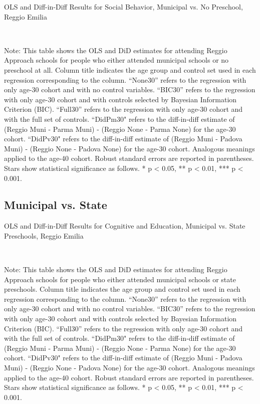 \begin{landscape}
\begin{table}[H] \caption{OLS and Diff-in-Diff Results for Social Behavior, Municipal vs. No Preschool, Reggio Emilia} \label{ols-S-reg}
\scalebox{0.85}{
}
\vspace{1ex} \\
\footnotesize\raggedright{Note: This table shows the OLS and DiD estimates for attending Reggio Approach schools for people who either attended municipal schools or no preschool at all. Column title indicates the age group and control set used in each regression corresponding to the column. ``None30'' refers to the regression with only age-30 cohort and with no control variables. ``BIC30'' refers to the regression with only age-30 cohort and with controls selected by Bayesian Information Criterion (BIC). ``Full30'' refers to the regression with only age-30 cohort and with the full set of controls. ``DidPm30" refers to the diff-in-diff estimate of (Reggio Muni - Parma Muni) - (Reggio None - Parma None) for the age-30 cohort. ``DidPv30" refers to the diff-in-diff estimate of (Reggio Muni - Padova Muni) - (Reggio None - Padova None) for the age-30 cohort. Analogous meanings applied to the age-40 cohort. Robust standard errors are reported in parentheses. Stars show statistical significance as follows. * p < 0.05, ** p < 0.01, *** p < 0.001.}
\end{table}



\subsection{Municipal vs. State}
\begin{table}[H] \caption{OLS and Diff-in-Diff Results for Cognitive and Education, Municipal vs. State Preschools, Reggio Emilia} \label{ols-E-reg}
\scalebox{0.85}{}
\vspace{1ex} \\
\footnotesize\raggedright{Note: This table shows the OLS and DiD estimates for attending Reggio Approach schools for people who either attended municipal schools or state preschools. Column title indicates the age group and control set used in each regression corresponding to the column. ``None30'' refers to the regression with only age-30 cohort and with no control variables. ``BIC30'' refers to the regression with only age-30 cohort and with controls selected by Bayesian Information Criterion (BIC). ``Full30'' refers to the regression with only age-30 cohort and with the full set of controls. ``DidPm30" refers to the diff-in-diff estimate of (Reggio Muni - Parma Muni) - (Reggio None - Parma None) for the age-30 cohort. ``DidPv30" refers to the diff-in-diff estimate of (Reggio Muni - Padova Muni) - (Reggio None - Padova None) for the age-30 cohort. Analogous meanings applied to the age-40 cohort. Robust standard errors are reported in parentheses. Stars show statistical significance as follows. * p < 0.05, ** p < 0.01, *** p < 0.001.}
\end{table}


\end{landscape}

